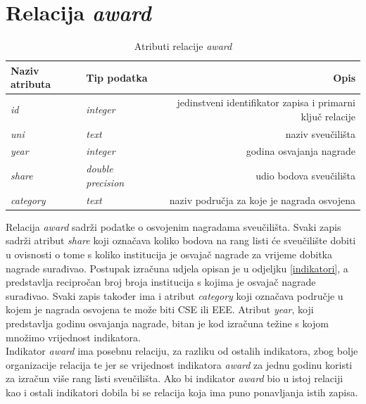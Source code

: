 \documentclass[times, utf8, zavrsni]{fer}
\begin{document}
           \section{Relacija \emph{award}}
           \begin{table}[htb]
               \caption{Atributi relacije \emph{award}}
                   \label{tbl:award}
                   \centering
                   \begin{tabular}{llr} \hline
                   Naziv atributa & Tip podatka & Opis\\ \hline
                   \emph{id} &  \emph{integer} & jedinstveni identifikator zapisa i primarni ključ relacije\\
                   \emph{uni} &  \emph{text} & naziv sveučilišta\\
                   \emph{year} &  \emph{integer} & godina osvajanja nagrade\\
                   \emph{share} &  \emph{double precision} & udio bodova sveučilišta\\
                   \emph{category} &  \emph{text} & naziv područja za koje je nagrada osvojena\\
                   \end{tabular}
                   \end{table}    
                   \FloatBarrier 
           Relacija \emph{award} sadrži podatke o osvojenim nagradama sveučilišta. Svaki zapis sadrži atribut \emph{share} koji označava 
           koliko bodova na rang listi će sveučilište dobiti u ovisnosti o tome s koliko institucija je osvajač nagrade za vrijeme dobitka nagrade
           surađivao. Postupak izračuna udjela opisan je u odjeljku \ref{indikatori}, a predstavlja recipročan broj broja institucija s kojima je osvajač 
           nagrade surađivao. Svaki zapis također ima i atribut \emph{category} koji označava područje u kojem je nagrada osvojena te može biti CSE ili EEE.
           Atribut \emph{year}, koji predstavlja godinu osvajanja nagrade, bitan je kod izračuna težine s kojom množimo vrijednost indikatora.
           \\Indikator \emph{award} ima posebnu relaciju, za razliku od ostalih indikatora, zbog bolje organizacije relacija te jer se 
           vrijednost indikatora \emph{award} za jednu godinu koristi za izračun više rang listi sveučilišta. Ako bi indikator \emph{award} bio u istoj relaciji
           kao i ostali indikatori dobila bi se relacija koja ima puno ponavljanja istih zapisa.
\end{document}
